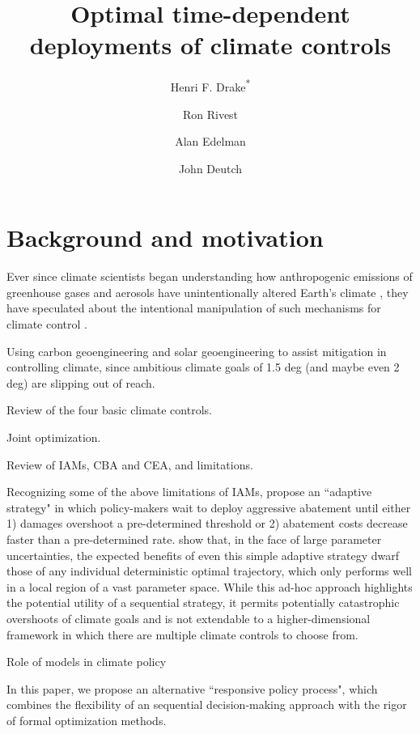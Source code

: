 \documentclass{article}
\title{Optimal time-dependent deployments of climate controls}
\author[1,2]{Henri F. Drake\textsuperscript{*}}
\author[1]{Ron Rivest}
\author[1]{Alan Edelman}
\author[1]{John Deutch}
\affil[1]{Massachusetts Institute of Technology, Cambridge, MA, USA}
\affil[2]{Woods Hole Oceanographic Institution, Woods Hole, MA, USA}
\date{}             %
\begin{document}
\maketitle

\section{Background and motivation}

Ever since climate scientists began understanding how anthropogenic emissions of greenhouse gases and aerosols have unintentionally altered Earth's climate \citep{manabe1967thermal, schneider_carbon_1975, broecker_climatic_1975}, they have speculated about the intentional manipulation of such mechanisms for climate control \citep[][and references therein]{kellogg_climate_1974}.

Using carbon geoengineering and solar geoengineering to assist mitigation in controlling climate, since ambitious climate goals of 1.5 deg (and maybe even 2 deg) are slipping out of reach.

Review of the four basic climate controls.

Joint optimization.

Review of IAMs, CBA and CEA, and limitations.

Recognizing some of the above limitations of IAMs, \cite{lempert_when_1996} propose an ``adaptive strategy" in which policy-makers wait to deploy aggressive abatement until either 1) damages overshoot a pre-determined threshold or 2) abatement costs decrease faster than a pre-determined rate. \cite{lempert_when_1996} show that, in the face of large parameter uncertainties, the expected benefits of even this simple adaptive strategy dwarf those of any individual deterministic optimal trajectory, which only performs well in a local region of a vast parameter space. While this ad-hoc approach highlights the potential utility of a sequential strategy, it permits potentially catastrophic overshoots of climate goals and is not extendable to a higher-dimensional framework in which there are multiple climate controls to choose from.

Role of models in climate policy

In this paper, we propose an alternative ``responsive policy process", which combines the flexibility of an sequential decision-making approach \citep[e.g.][]{hammitt_sequential-decision_1992, lempert_when_1996} with the rigor of formal optimization methods.

\end{document}
